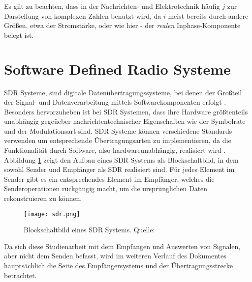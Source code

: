 Es gilt zu beachten, dass in der Nachrichten- und Elektrotechnik häufig $j$ zur Darstellung von komplexen Zahlen benutzt wird, da $i$ meist bereits durch andere Größen, etwa der Stromstärke, oder wie hier - der \textit{realen} Inphase-Komponente belegt ist.

\section{Software Defined Radio Systeme} 
\ac{SDR} Systeme, sind digitale Datenübertragungssysteme, bei denen der Großteil der Signal- und Datenverarbeitung mittels Softwarekomponenten erfolgt \cite[Heuberger, e. a., S. 1]{Heuberger:2017}.
Besonders hervorzuheben ist bei \ac{SDR} Systemen, dass ihre Hardware größtenteils unabhängig gegeüeber nachrichtentechnischer Eigenschaften wie der Symbolrate und der Modulationsart sind. \ac{SDR} Systeme können verschiedene Standards verwenden um entsprechende Übertragungsarten zu implementieren, da die Funktionalität durch Software, also hardwareunabhängig, realisiert wird \cite[Heuberger, e. a., S. 36]{Heuberger:2017}. \newline
Abbildung \ref{sdr-blockschaltbild} zeigt den Aufbau eines \ac{SDR} Systems als Blockschaltbild, in dem sowohl Sender und Empfänger als SDR realisiert sind.
Für jedes Element im Sender gibt es ein entsprechendes Element im Empfänger, welches die Senderoperationen rückgängig macht, um die ursprünglichen Daten rekonstruieren zu können.
\begin{figure}[ht]
	\centering
	\texttt{[image: sdr.png]}
	\caption[Blockschaltbild eines SDR Systems]{Blockschaltbild eines SDR Systems. Quelle: \cite[Heuberger, e. a., S. 37]{Heuberger:2017}}
	\label{sdr-blockschaltbild}
\end{figure}

Da sich diese Studienarbeit mit dem Empfangen und Auswerten von Signalen, aber nicht dem Senden befasst, wird im weiteren Verlauf des Dokumentes hauptsächlich die Seite des Empfängersystems und der Übertragungsstrecke betrachtet.

